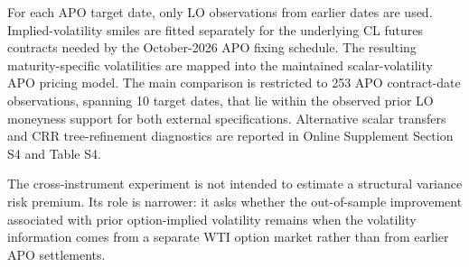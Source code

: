 For each APO target date, only LO observations from earlier dates are used. Implied-volatility smiles are fitted separately for the underlying CL futures contracts needed by the October-2026 APO fixing schedule. The resulting maturity-specific volatilities are mapped into the maintained scalar-volatility APO pricing model. The main comparison is restricted to 253 APO contract-date observations, spanning 10 target dates, that lie within the observed prior LO moneyness support for both external specifications. Alternative scalar transfers and CRR tree-refinement diagnostics are reported in Online Supplement Section S4 and Table S4.

The cross-instrument experiment is not intended to estimate a structural variance risk premium. Its role is narrower: it asks whether the out-of-sample improvement associated with prior option-implied volatility remains when the volatility information comes from a separate WTI option market rather than from earlier APO settlements.
